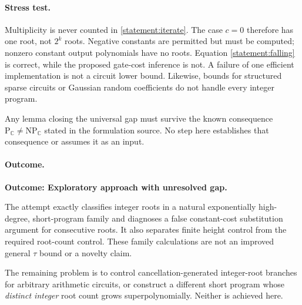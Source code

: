 \documentclass[11pt,a4paper]{article}
\newcommand{\C}{\mathbb{C}}
\numberwithin{equation}{section}
\begin{document}
\paragraph{Stress test.}
Multiplicity is never counted in \eqref{statement:iterate}. The case $c=0$
therefore has one root, not $2^k$ roots. Negative constants are permitted
but must be computed; nonzero constant output polynomials have no roots.
Equation \eqref{statement:falling} is correct, while the proposed gate-cost
inference is not. A failure of one efficient implementation is not a
circuit lower bound. Likewise, bounds for structured sparse circuits or
Gaussian random coefficients do not handle every integer program.

Any lemma closing the universal gap must survive the known consequence
$\mathrm P_{\C}\ne\mathrm{NP}_{\C}$ stated in the formulation source.
No step here establishes that consequence or assumes it as an input.

\paragraph{Outcome.}
\textbf{Outcome: Exploratory approach with unresolved gap.}

The attempt exactly classifies integer roots in a natural exponentially
high-degree, short-program family and diagnoses a false constant-cost
substitution argument for consecutive roots. It also separates finite
height control from the required root-count control. These family
calculations are not an improved general $\tau$ bound or a novelty claim.

The remaining problem is to control cancellation-generated integer-root
branches for arbitrary arithmetic circuits, or construct a different
short program whose \emph{distinct integer} root count grows
superpolynomially. Neither is achieved here.
\end{document}
